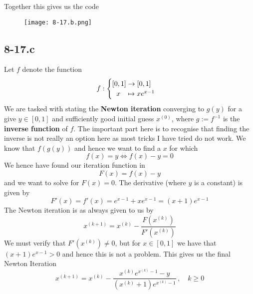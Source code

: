 \documentclass{article}
\begin{document}
\pagebreak

\noindent Together this gives us the code
\begin{figure}[!hbt]
    \centering
\texttt{[image: 8-17.b.png]}
\end{figure}
\subsection*{8-17.c}
Let $f$ denote the function
\begin{equation*}
    f : \begin{cases}
        \left[0,1\right] \to \left[0,1\right] \\
        \hspace{6px} x \hspace{8px} \mapsto xe^{x-1}
    \end{cases}
\end{equation*}
We are tasked with stating the \textbf{Newton iteration} converging to $g\left(y\right)$ for a give $y \in \left[0,1\right]$ and sufficiently good initial guess $x^{\left(0\right)}$, where $g:=f^{-1}$ is the \textbf{inverse function} of $f$. The important part here is to recognise that finding the inverse is not really an option here as most tricks I have tried do not work. We know that $f\left(g\left(y\right)\right)$ and hence we want to find a $x$ for which 
\begin{equation*}
    f\left(x\right) = y \Longleftrightarrow f\left(x\right) - y = 0
\end{equation*}
We hence have found our iteration function in
\begin{equation*}
    F\left(x\right) = f\left(x\right) - y 
\end{equation*}
and we want to solve for $F\left(x\right) = 0$. The derivative (where $y$ is a constant) is given by
\begin{equation*}
    F'\left(x\right) = f'\left(x\right) = e^{x-1} + xe^{x-1} = \left(x + 1\right)e^{x-1}
\end{equation*}
The Newton iteration is as always given to us by
\begin{equation*}
    x^{\left(k+1\right)} = x^{\left(k\right)} - \frac{F\left(x^{\left(k\right)}\right)}{F'\left(x^{\left(k\right)}\right)}
\end{equation*}
We must verify that $F'\left(x^{\left(k\right)}\right) \neq 0$, but for $x \in \left[0,1\right]$ we have that $\left(x+1\right)e^{x-1} > 0$ and hence this is not  a problem. This gives us the final Newton Iteration
\begin{equation*}
    x^{\left(k+1\right)} = x^{\left(k\right)} - \frac{x^{\left(k\right)}e^{x^{\left(k\right)}-1}-y}{\left(x^{\left(k\right)} + 1\right)e^{x^{\left(k\right)}-1}}\,,\quad k \geq 0
\end{equation*}
\end{document}
